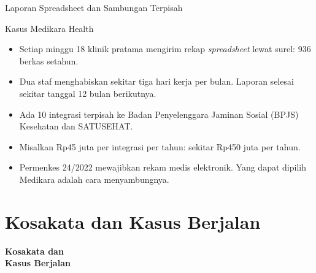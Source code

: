 \documentclass[aspectratio=169, table, 12pt]{beamer}
\begin{document}
\begin{frame}{{\Large Laporan Spreadsheet dan Sambungan Terpisah}}
  \begin{block}{Kasus Medikara Health}
    \small
    \begin{itemize}
      \item Setiap minggu 18 klinik pratama mengirim rekap \textit{spreadsheet} lewat surel: 936 berkas setahun.
      \item Dua staf menghabiskan sekitar tiga hari kerja per bulan. Laporan selesai sekitar tanggal 12 bulan berikutnya.
      \item Ada 10 integrasi terpisah ke Badan Penyelenggara Jaminan Sosial (BPJS) Kesehatan dan SATUSEHAT.
      \item Misalkan Rp45 juta per integrasi per tahun: sekitar Rp450 juta per tahun.
      \item Permenkes 24/2022 mewajibkan rekam medis elektronik. Yang dapat dipilih Medikara adalah cara menyambungnya.
    \end{itemize}
  \end{block}
\end{frame}

\section{Kosakata dan Kasus Berjalan}

\begin{frame}{\hfill}
  \centering
  \Huge{\textbf{Kosakata dan\\Kasus Berjalan}}
\end{frame}
\end{document}
